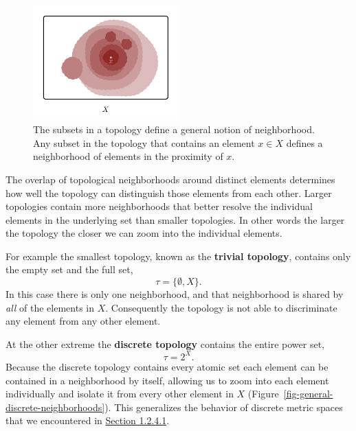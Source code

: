 \documentclass[
  letterpaper,
  DIV=11,
  numbers=noendperiod]{scrartcl}
\begin{document}
\begin{figure}

{\centering \includegraphics[width=0.5\textwidth,height=\textheight]{figures/structures/general_topology/neighborhoods/neighborhoods.pdf}

}

\caption{\label{fig-continuous-general-neighborhoods}The subsets in a
topology define a general notion of neighborhood. Any subset in the
topology that contains an element \(x \in X\) defines a neighborhood of
elements in the proximity of \(x\).}

\end{figure}

The overlap of topological neighborhoods around distinct elements
determines how well the topology can distinguish those elements from
each other. Larger topologies contain more neighborhoods that better
resolve the individual elements in the underlying set than smaller
topologies. In other words the larger the topology the closer we can
zoom into the individual elements.

For example the smallest topology, known as the \textbf{trivial
topology}, contains only the empty set and the full set, \[
\tau = \{ \emptyset, X \}.
\] In this case there is only one neighborhood, and that neighborhood is
shared by \emph{all} of the elements in \(X\). Consequently the topology
is not able to discriminate any element from any other element.

At the other extreme the \textbf{discrete topology} contains the entire
power set, \[
\tau = 2^{X}.
\] Because the discrete topology contains every atomic set each element
can be contained in a neighborhood by itself, allowing us to zoom into
each element individually and isolate it from every other element in
\(X\) (Figure~\ref{fig-general-discrete-neighborhoods}). This
generalizes the behavior of discrete metric spaces that we encountered
in \href{@sec:open-balls}{Section 1.2.4.1}.
\end{document}
